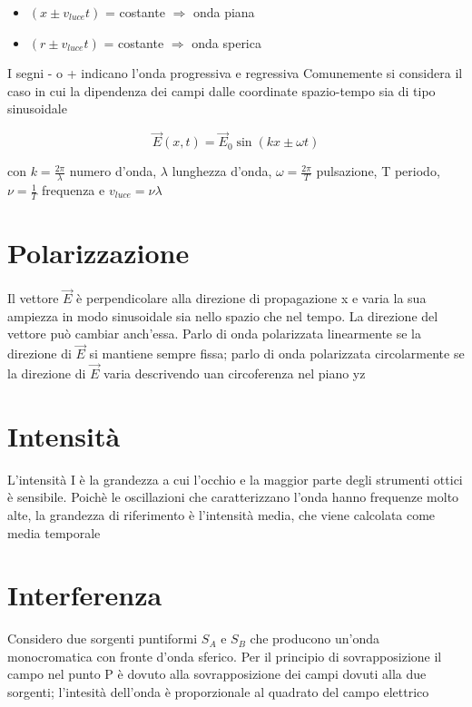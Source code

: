 \documentclass[a4paper,11pt]{report}
\begin{document}
\begin{itemize}
    \item $(x \pm v_{luce}t)$ = costante $\Rightarrow$ onda piana
    \item $(r \pm v_{luce}t)$ = costante $\Rightarrow$ onda sperica
\end{itemize}

\noindent I segni - o + indicano l'onda progressiva e regressiva \newline
Comunemente si considera il caso in cui la dipendenza dei campi dalle coordinate spazio-tempo sia di tipo sinusoidale

\begin{equation*}
    \vec{E}(x,t) = \vec{E}_0 \sin{(kx \pm \omega t)}
\end{equation*}

\noindent con $k = \frac{2\pi}{\lambda}$ numero d'onda, $\lambda$ lunghezza d'onda, $\omega = \frac{2\pi}{T}$ pulsazione, T periodo, $\nu = \frac{1}{T}$ frequenza e $v_{luce} = \nu \lambda$

\section{Polarizzazione}

Il vettore $\vec{E}$ è perpendicolare alla direzione di propagazione x e varia la sua ampiezza in modo sinusoidale sia nello spazio che nel tempo.
La direzione del vettore può cambiar anch'essa.
Parlo di onda polarizzata linearmente se la direzione di $\vec{E}$ si mantiene sempre fissa; parlo di onda polarizzata circolarmente se la direzione di $\vec{E}$ varia descrivendo uan circoferenza nel piano yz

\section{Intensità}

L'intensità I è la grandezza a cui l'occhio e la maggior parte degli strumenti ottici è sensibile.
Poichè le oscillazioni che caratterizzano l'onda hanno frequenze molto alte, la grandezza di riferimento è l'intensità media, che viene calcolata come media temporale

\section{Interferenza}

Considero due sorgenti puntiformi $S_A$ e $S_B$ che producono un'onda monocromatica con fronte d'onda sferico.
Per il principio di sovrapposizione il campo nel punto P è dovuto alla sovrapposizione dei campi dovuti alla due sorgenti; l'intesità dell'onda è proporzionale al quadrato del campo elettrico
\end{document}
